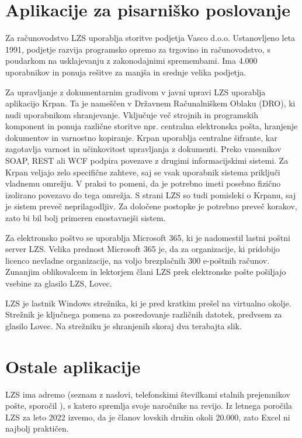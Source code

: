 \documentclass[a4paper,12pt,openright]{book}
\begin{document}
\section{Aplikacije za pisarniško poslovanje}

Za računovodstvo LZS uporablja storitve podjetja Vasco d.o.o.
Ustanovljeno leta 1991, podjetje razvija programsko opremo za trgovino in računovodstvo, s poudarkom na usklajevanju z zakonodajnimi spremembami. 
Ima 4.000 uporabnikov in ponuja rešitve za manjša in srednje velika podjetja. \cite{vasco}

Za upravljanje z dokumentarnim gradivom v javni upravi LZS uporablja aplikacijo Krpan. 
Ta je nameščen v Državnem Računalniškem Oblaku (DRO), ki nudi uporabnikom shranjevanje. Vključuje več strojnih in programskih komponent in ponuja različne storitve npr. centralna elektronska pošta, hranjenje dokumentov in varnostno kopiranje.\cite{drzavni_oblak}
Krpan uporablja centralne šifrante, kar zagotavlja varnost in učinkovitost upravljanja z dokumenti.
Preko vmesnikov SOAP, REST ali WCF podpira povezave z drugimi informacijskimi sistemi.
Za Krpan veljajo zelo specifične zahteve, saj se vsak uporabnik sistema priključi vladnemu omrežju.\cite{krpan}
V praksi to pomeni, da je potrebno imeti posebno fizično izolirano povezavo do tega omrežja.
S strani LZS so tudi pomisleki o Krpanu, saj je sistem preveč neprilagodljiv.
Za določene postopke je potrebno preveč korakov, zato bi bil bolj primeren enostavnejši sistem. 

Za elektronsko poštvo se uporablja Microsoft 365, ki je nadomestil lastni poštni server LZS.
Velika prednost Microsoft 365 je, da za organizacije, ki pridobijo licenco nevladne organizacije, na voljo brezplačnih 300 e-poštnih računov.
Zunanjim oblikovalcem in lektorjem člani LZS prek elektronske pošte pošiljajo vsebine za glasilo LZS, Lovec.

LZS je lastnik Windows strežnika, ki je pred kratkim prešel na virtualno okolje.
Strežnik je ključnega pomena za posredovanje različnih datotek, predvsem za glasilo Lovec.
Na strežniku je shranjenih skoraj dva terabajta slik.


\section{Ostale aplikacije}

LZS ima adremo (seznam z naslovi, telefonskimi številkami stalnih prejemnikov pošte, sporočil \cite{fran}), s katero spremlja svoje naročnike na revijo. 
Iz letnega poročila LZS za leto 2022 izvemo, da je članov lovskih družin okoli 20.000, zato Excel ni najbolj praktičen.
\end{document}
